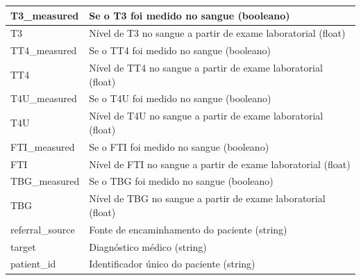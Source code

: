 \documentclass[11pt]{article}
\begin{document}
\begin{table}[H]
\begin{tabular}{|l|p{10cm}|}
T3\_measured & Se o T3 foi medido no sangue (booleano) \\ \hline
T3 & Nível de T3 no sangue a partir de exame laboratorial (float) \\ \hline
TT4\_measured & Se o TT4 foi medido no sangue (booleano) \\ \hline
TT4 & Nível de TT4 no sangue a partir de exame laboratorial (float) \\ \hline
T4U\_measured & Se o T4U foi medido no sangue (booleano) \\ \hline
T4U & Nível de T4U no sangue a partir de exame laboratorial (float) \\ \hline
FTI\_measured & Se o FTI foi medido no sangue (booleano) \\ \hline
FTI & Nível de FTI no sangue a partir de exame laboratorial (float) \\ \hline
TBG\_measured & Se o TBG foi medido no sangue (booleano) \\ \hline
TBG & Nível de TBG no sangue a partir de exame laboratorial (float) \\ \hline
referral\_source & Fonte de encaminhamento do paciente (string) \\ \hline
target & Diagnóstico médico (string) \\ \hline
patient\_id & Identificador único do paciente (string) \\ \hline
\end{tabular}
\end{table}
\end{document}
